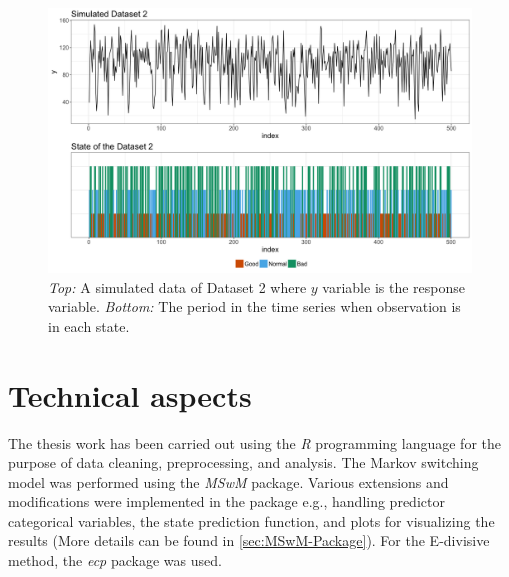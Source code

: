 \begin{figure}[H]
\begin{centering}
\includegraphics[scale=0.35]{picture/sim2}
\par\end{centering}
\caption{\emph{Top:} A simulated data of Dataset 2 where $y$ variable is the
response variable. \emph{Bottom:} The period in the time series when
observation is in each state.}
\label{sim_data2}
\end{figure}


\section{Technical aspects}

The thesis work has been carried out using the \emph{R} programming
language for the purpose of data cleaning, preprocessing, and analysis.
The Markov switching model was performed using the \emph{MSwM} package.
Various extensions and modifications were implemented in the package
e.g., handling predictor categorical variables, the state prediction
function, and plots for visualizing the results (More details can
be found in \ref{sec:MSwM-Package}). For the E-divisive method, the
\emph{ecp} package was used. 


